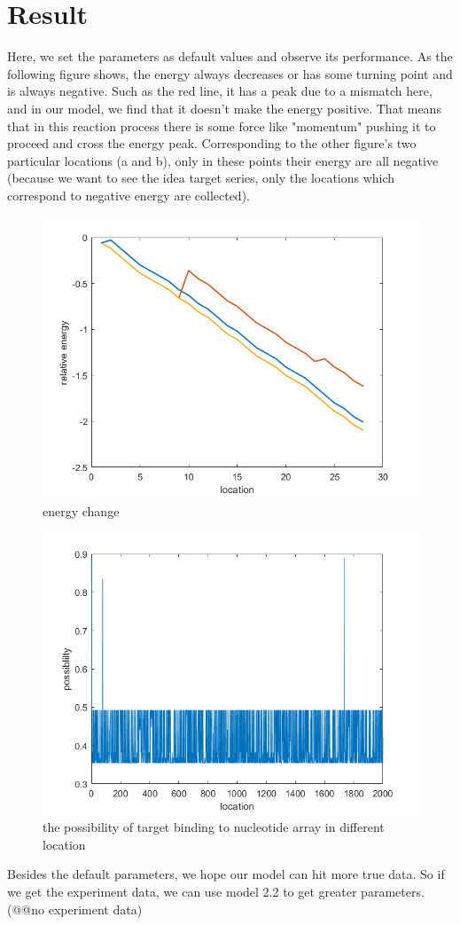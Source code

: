 \section{Result}
Here, we set the parameters as default values and observe its performance. As the following figure shows, the energy always decreases or has some turning point and is always negative. Such as the red line, it has a peak due to a mismatch here, and in our model, we find that it doesn't make the energy positive. That means that in this reaction process there is some force like "momentum" pushing it to proceed and cross the energy peak. Corresponding to the other figure's two particular locations (a and b), only in these points their energy are all negative (because we want to see the idea target series, only the locations which correspond to negative energy are collected).
\begin{figure}[h]
\centering
\includegraphics[width=0.7\linewidth]{energy_change}
\caption{energy change}
\label{fig:energychange}
\end{figure}
\begin{figure}[h]
\centering
\includegraphics[width=0.7\linewidth]{fig1}
\caption{the possibility of target binding to nucleotide array in different location}
\label{fig:fig1}
\end{figure}
Besides the default parameters, we hope our model can hit more true data. So if we get the experiment data, we can use model 2.2 to get greater parameters. (@@no experiment data) 
